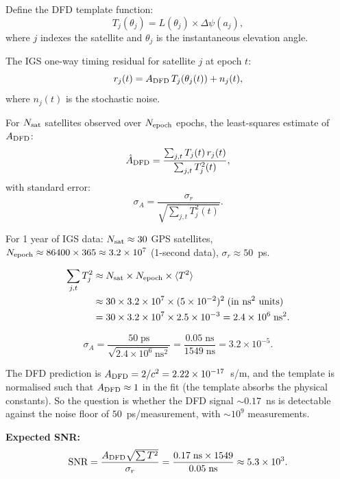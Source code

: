 \documentclass[aps,prd,twocolumn,superscriptaddress,nofootinbib]{revtex4-2}
\begin{document}
Define the DFD template function:
\begin{equation}
T_j(\theta_j) = L(\theta_j)\times\Delta\psi(a_j),
\end{equation}
where $j$ indexes the satellite and $\theta_j$ is the instantaneous
elevation angle.

The IGS one-way timing residual for satellite $j$ at epoch $t$:
\begin{equation}
r_j(t) = A_{\rm DFD}\,T_j(\theta_j(t)) + n_j(t),
\end{equation}
where $n_j(t)$ is the stochastic noise.

For $N_{\rm sat}$ satellites observed over $N_{\rm epoch}$ epochs,
the least-squares estimate of $A_{\rm DFD}$:
\begin{equation}
\hat{A}_{\rm DFD} = \frac{\sum_{j,t} T_j(t)\,r_j(t)}
{\sum_{j,t} T_j^2(t)},
\end{equation}
with standard error:
\begin{equation}
\sigma_A = \frac{\sigma_r}{\sqrt{\sum_{j,t} T_j^2(t)}}.
\end{equation}

For 1 year of IGS data: $N_{\rm sat} \approx 30$ GPS satellites,
$N_{\rm epoch} \approx 86400\times365 \approx 3.2\times10^7$
(1-second data), $\sigma_r \approx 50$~ps.

\begin{align}
\sum_{j,t}T_j^2 &\approx N_{\rm sat}\times N_{\rm epoch}
\times\langle T^2\rangle \nonumber\\
&\approx 30\times3.2\times10^7\times(5\times10^{-2})^2\;\text{(in ns$^2$ units)}
\nonumber\\
&= 30\times3.2\times10^7\times2.5\times10^{-3}
= 2.4\times10^6\;\text{ns}^2.
\end{align}

\begin{equation}
\sigma_A = \frac{50\;\text{ps}}{\sqrt{2.4\times10^6\;\text{ns}^2}}
= \frac{0.05\;\text{ns}}{1549\;\text{ns}}
= 3.2\times10^{-5}.
\end{equation}

The DFD prediction is $A_{\rm DFD} = 2/c^2 = 2.22\times10^{-17}$~s/m,
and the template is normalised such that $A_{\rm DFD} \approx 1$ in the
fit (the template absorbs the physical constants). So the question
is whether the DFD signal $\sim 0.17$~ns is detectable against
the noise floor of $50$~ps/measurement, with $\sim 10^9$ measurements.

\textbf{Expected SNR:}
\begin{equation}
\text{SNR} = \frac{A_{\rm DFD}\sqrt{\sum T^2}}{\sigma_r}
= \frac{0.17\;\text{ns}\times1549}{0.05\;\text{ns}}
\approx 5.3\times10^3.
\end{equation}
\end{document}
